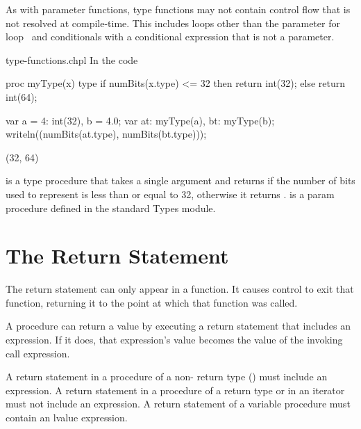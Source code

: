 As with parameter functions, type functions may not contain control
flow that is not resolved at compile-time.  This includes loops other
than the parameter for loop~ and
conditionals with a conditional expression that is not a parameter.

\begin{chapelexample}{type-functions.chpl}
In the code
\begin{chapel}
proc myType(x) type {
  if numBits(x.type) <= 32 then return int(32);
  else return int(64);
}
\end{chapel}
\begin{chapelpost}
var a = 4: int(32),
    b = 4.0;
var at: myType(a),
    bt: myType(b);
writeln((numBits(at.type), numBits(bt.type)));
\end{chapelpost}
\begin{chapeloutput}
(32, 64)
\end{chapeloutput}
 is a type procedure that takes a single
argument  and returns  if the number of bits used to
represent  is less than or equal to 32, otherwise it
returns .   is a param
procedure defined in the standard Types module.
\end{chapelexample}


\section{The Return Statement}
\label{The_Return_Statement}

The return statement can only appear in a function.  It causes control
to exit that function, returning it to the point at which that function
was called.

A procedure can return a value by executing a return statement
that includes an expression. If it does, that expression's value
becomes the value of the invoking call expression.

A return statement in a procedure of a non- return type
() must include an expression.
A return statement in a procedure of a  return type
or in an iterator must not include an expression.
A return statement of a variable procedure must contain an lvalue expression.



